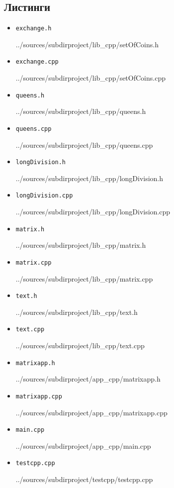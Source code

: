 \documentclass[12pt,a4paper]{report}
\begin{document}
\subsection*{Листинги}
\begin{itemize}


\item[] \verb-exchange.h-

{../sources/subdirproject/lib_cpp/setOfCoins.h}

\item[] \verb-exchange.cpp-

{../sources/subdirproject/lib_cpp/setOfCoins.cpp}

\item[] \verb-queens.h-

{../sources/subdirproject/lib_cpp/queens.h}

\item[] \verb-queens.cpp-

{../sources/subdirproject/lib_cpp/queens.cpp}

\item[] \verb-longDivision.h-

{../sources/subdirproject/lib_cpp/longDivision.h}

\item[] \verb-longDivision.cpp-

{../sources/subdirproject/lib_cpp/longDivision.cpp}

\item[] \verb-matrix.h-

{../sources/subdirproject/lib_cpp/matrix.h}

\item[] \verb-matrix.cpp-

{../sources/subdirproject/lib_cpp/matrix.cpp}

\item[] \verb-text.h-

{../sources/subdirproject/lib_cpp/text.h}

\item[] \verb-text.cpp-

{../sources/subdirproject/lib_cpp/text.cpp}

\item[] \verb-matrixapp.h-

{../sources/subdirproject/app_cpp/matrixapp.h}

\item[] \verb-matrixapp.cpp-

{../sources/subdirproject/app_cpp/matrixapp.cpp}

\item[] \verb-main.cpp-

{../sources/subdirproject/app_cpp/main.cpp}

\item[] \verb-testcpp.cpp-

{../sources/subdirproject/testcpp/testcpp.cpp}
\end{itemize}
\end{document}
